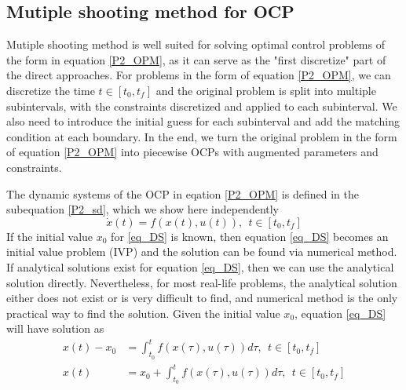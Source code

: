 \documentclass  [
  paper    = a4,
  BCOR     = 10mm,
  twoside,
  fontsize = 12pt,
  fleqn,
  toc      = bibnumbered,
  toc      = listofnumbered,
  numbers  = noendperiod,
  headings = normal,
  listof   = leveldown,
  version  = 3.03
]                                       {scrreprt}
\newcommand{\<}{\langle}
\renewcommand{\>}{\rangle}
\begin{document}
\subsection{Mutiple shooting method for OCP}
\label{Sec_MS_OCP}
Mutiple shooting method is well suited for solving optimal control problems of the form in equation \ref{P2_OPM}, as it can serve as the "first discretize" part of the direct approaches. For problems in the form of equation \ref{P2_OPM}, we can discretize the time $t \in [t_0, t_f]$ and the original problem is split into multiple subintervals, with the constraints discretized and applied to each subinterval. We also need to introduce the initial guess for each subinterval and add the matching condition at each boundary. In the end, we turn the original problem in the form of equation  \ref{P2_OPM} into piecewise OCPs with augmented parameters and constraints. 

The dynamic systems of the OCP in eqation \ref{P2_OPM} is defined in the subequation 
\ref{P2_sd}, which we show here independently
\begin{equation}
	\dot{x} (t) = f(x(t), u(t)), \ \   t \in [t_0, t_f]
	\label{eq_DS}
\end{equation}
If the initial value $x_0$ for \ref{eq_DS} is known, then equation \ref{eq_DS} becomes an initial value problem (IVP) and the solution can be found via numerical method. If analytical solutions exist for equation \ref{eq_DS}, then we can use the analytical solution directly. Nevertheless, for most real-life problems, the analytical solution either does not exist or is very difficult to find, and numerical method is the only practical way to find the solution. Given the initial value $x_0$, equation \ref{eq_DS} will have solution as 
\begin{equation}\label{eq_diffSolution}
	\begin{aligned}
		x(t) -  x_0  &= \int_{t_0}^{t}  f(x(\tau), u(\tau)) d \tau,   \ \ t \in [t_0, t_f] \\ 
		x(t) & = x_0  + \int_{t_0}^{t}  f(x(\tau), u(\tau)) d \tau,   \ \ t \in [t_0, t_f] 
	\end{aligned}
\end{equation}
\end{document}

